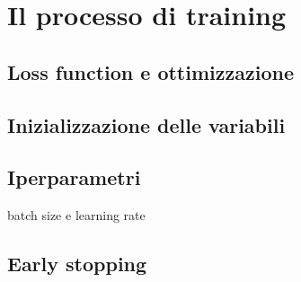 \section{Il processo di training}
\subsection{Loss function e ottimizzazione}
\subsection{Inizializzazione delle variabili}
\subsection{Iperparametri}
batch size e learning rate
\subsection{Early stopping}